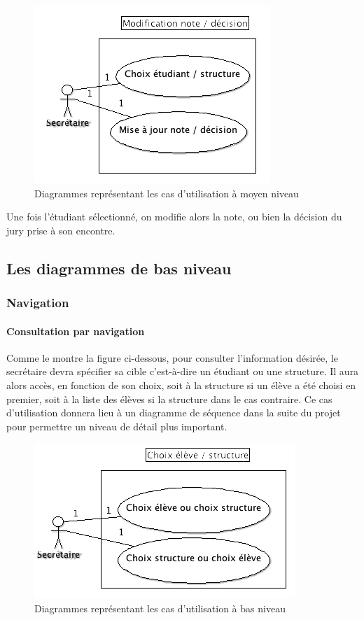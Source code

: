 \documentclass[letter, 11pt] {article}
\begin{document}
			\begin{figure}[!h]
				\centering
					\includegraphics[scale = 0.5]{../UseCase/UseCaseMoyenNiveau/ModificationNoteDecision.png}
				\caption{Diagrammes représentant les cas d'utilisation à moyen niveau}
			\end{figure}
			
			Une fois l'étudiant sélectionné, on modifie alors la note, ou bien la décision du jury prise à son encontre.
	
\newpage
	\subsection{Les diagrammes de bas niveau}
	
		\subsubsection{Navigation}

			\paragraph{Consultation par navigation} Comme le montre la figure ci-dessous, pour consulter l'information désirée, le secrétaire devra spécifier sa cible c'est-à-dire un étudiant ou une structure. Il aura alors accès, en fonction de son choix, soit à la structure si un élève a été choisi en premier, soit à la liste des élèves si la structure dans le cas contraire.
Ce cas d'utilisation donnera lieu à un diagramme de séquence dans la suite du projet pour permettre un niveau de détail plus important.
		\begin{figure}[!h]\centering
				\includegraphics[scale = 0.5]{../UseCase/UseCaseBasNiveau/ChoixEleveStructure.png}
					\caption{Diagrammes représentant les cas d'utilisation à bas niveau}
\end{figure}
\end{document}
